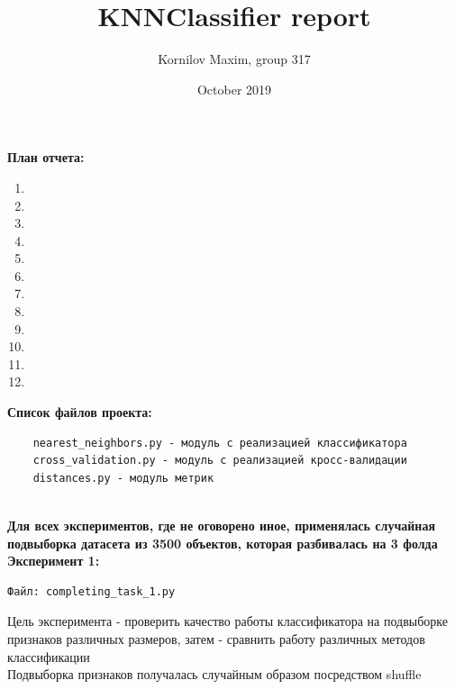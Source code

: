 \documentclass{article}
\title{KNNClassifier report}
\author{Kornilov Maxim, group 317}
\date{October 2019}
\begin{document}
\maketitle

\textbf{\Large План отчета:}

\begin{enumerate}
    \item {} 
    \item {} 
    \item {} 
    \item {} 
    \item {} 
    \item {} 
    \item {} 
    \item {} 
    \item {} 
    \item {} 
    \item {}
    \item {}
\end{enumerate}

\textbf{\Large Список файлов проекта:} \\
\begin{verbatim}
    nearest_neighbors.py - модуль с реализацией классификатора 
    cross_validation.py - модуль с реализацией кросс-валидации 
    distances.py - модуль метрик
\end{verbatim} \\

\textbf{\large Для всех экспериментов, где не оговорено иное, применялась случайная подвыборка датасета из 3500 объектов, которая разбивалась на 3 фолда} \\

\textbf{\Large Эксперимент 1:} \\
\begin{verbatim}
Файл: completing_task_1.py
\end{verbatim}
Цель эксперимента - проверить качество работы классификатора на подвыборке признаков различных размеров, затем - сравнить работу различных методов классификации \\
Подвыборка признаков получалась случайным образом посредством shuffle \\
\end{document}
